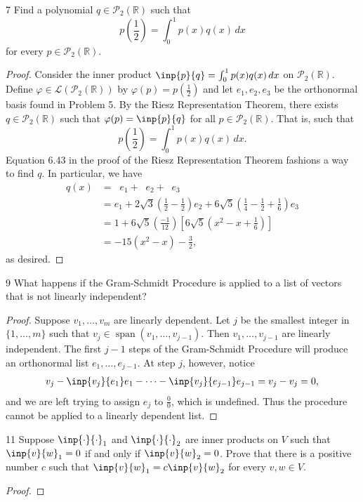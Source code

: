 \documentclass{extarticle}
\newenvironment{problem}[1]{\begin{prob*}{#1}{}}{\end{prob*}}
\newcommand{\R}{\mathbb{R}}
\newcommand{\poly}{\mathcal{P}}
\DeclareMathOperator{\Span}{span}
\newcommand{\Hom}{\mathcal{L}}
\newcommand\widebar[1]{\mathop{\overline{#1}}}
\begin{document}
\begin{problem}{7}
Find a polynomial $q\in\poly_2(\R)$ such that
\begin{equation*}
p\left(\frac{1}{2}\right)=\int_0^1p(x)q(x)\,dx
\end{equation*}
for every $p\in\poly_2(\R)$.  
\end{problem}
\begin{proof}
Consider the inner product $\inp{p}{q} = \int_0^1p(x)q(x)\,dx$ on $\poly_2(\R)$.  Define $\varphi\in\Hom(\poly_2(\R))$ by $\varphi(p) = p\left(\frac{1}{2}\right)$ and let $e_1, e_2, e_3$ be the orthonormal basis found in Problem 5.  By the Riesz Representation Theorem, there exists $q\in\poly_2(\R)$ such that $\varphi(p) = \inp{p}{q}$ for all $p\in\poly_2(\R)$.  That is, such that 
\begin{equation*}
p\left(\frac{1}{2}\right) = \int_0^1p(x)q(x)\,dx.
\end{equation*}
Equation 6.43 in the proof of the Riesz Representation Theorem fashions a way to find $q$.  In particular, we have 
\begin{align*}
q(x) &= \widebar{\varphi(e_1)}e_1 + \widebar{\varphi(e_2)}e_2 + \widebar{\varphi(e_3)}e_3\\
&= e_1 + 2\sqrt{3}\left(\frac{1}{2} - \frac{1}{2}\right)e_2 + 6\sqrt{5}\left(\frac{1}{4} - \frac{1}{2} + \frac{1}{6}\right)e_3\\
&= 1 + 6\sqrt{5}\left(\frac{-1}{12}\right)\left[6\sqrt{5}\left(x^2 - x + \frac{1}{6}\right)\right]\\
&= -15(x^2 - x) - \frac{3}{2},
\end{align*}
as desired.
\end{proof}

\begin{problem}{9}
What happens if the Gram-Schmidt Procedure is applied to a list of vectors that is not linearly independent?
\end{problem}
\begin{proof}
Suppose $v_1,\dots,v_m$ are linearly dependent.  Let $j$ be the smallest integer in $\{1,\dots, m\}$ such that $v_j \in \Span(v_1,\dots, v_{j - 1})$.  Then $v_1,\dots, v_{j - 1}$ are linearly independent.  The first $j - 1$ steps of the Gram-Schmidt Procedure will produce an orthonormal list $e_1,\dots, e_{j - 1}$.  At step $j$, however, notice
\begin{align*}
v_j - \inp{v_j}{e_1}e_1 - \dots - \inp{v_j}{e_{j - 1}}e_{j-1} = v_j - v_j = 0,
\end{align*}
and we are left trying to assign $e_j$ to $\frac{0}{0}$, which is undefined.  Thus the procedure cannot be applied to a linearly dependent list.
\end{proof}

\begin{problem}{11}
Suppose $\inp{\cdot}{\cdot}_1$ and $\inp{\cdot}{\cdot}_2$ are inner products on $V$ such that $\inp{v}{w}_1 = 0$ if and only if $\inp{v}{w}_2 = 0$.  Prove that there is a positive number $c$ such that $\inp{v}{w}_1 = c\inp{v}{w}_2$ for every $v,w\in V$.
\end{problem}
\begin{proof}

\end{proof}
\end{document}
